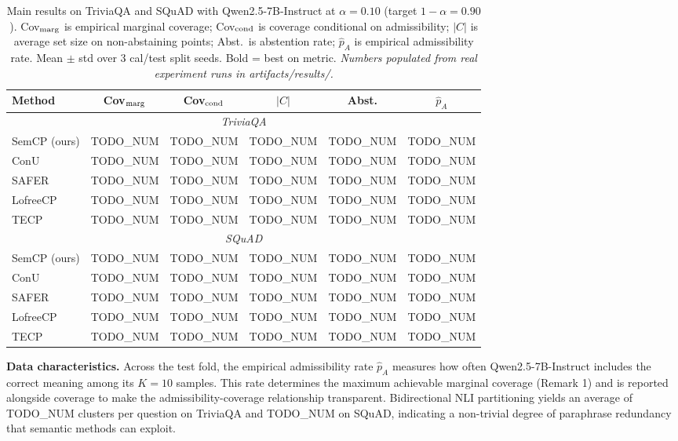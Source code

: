 \documentclass{article}
\begin{document}
\begin{table}[ht]
\centering
\caption{Main results on TriviaQA and SQuAD with Qwen2.5-7B-Instruct at $\alpha = 0.10$ (target $1-\alpha = 0.90$). Cov$_{\rm marg}$ is empirical marginal coverage; Cov$_{\rm cond}$ is coverage conditional on admissibility; $|C|$ is average set size on non-abstaining points; Abst.\ is abstention rate; $\hat{p}_A$ is empirical admissibility rate. Mean $\pm$ std over 3 cal/test split seeds. Bold = best on metric. \textit{Numbers populated from real experiment runs in artifacts/results/.}}
\label{tab:main_results}
\small
\begin{tabular}{lccccc}
\toprule
\textbf{Method} & \textbf{Cov$_{\rm marg}$} & \textbf{Cov$_{\rm cond}$} & \textbf{$|C|$} & \textbf{Abst.} & \textbf{$\hat{p}_A$} \\
\midrule
\multicolumn{6}{c}{\textit{TriviaQA}} \\
\midrule
SemCP (ours)  & TODO\_NUM & TODO\_NUM & TODO\_NUM & TODO\_NUM & TODO\_NUM \\
ConU          & TODO\_NUM & TODO\_NUM & TODO\_NUM & TODO\_NUM & TODO\_NUM \\
SAFER         & TODO\_NUM & TODO\_NUM & TODO\_NUM & TODO\_NUM & TODO\_NUM \\
LofreeCP      & TODO\_NUM & TODO\_NUM & TODO\_NUM & TODO\_NUM & TODO\_NUM \\
TECP          & TODO\_NUM & TODO\_NUM & TODO\_NUM & TODO\_NUM & TODO\_NUM \\
\midrule
\multicolumn{6}{c}{\textit{SQuAD}} \\
\midrule
SemCP (ours)  & TODO\_NUM & TODO\_NUM & TODO\_NUM & TODO\_NUM & TODO\_NUM \\
ConU          & TODO\_NUM & TODO\_NUM & TODO\_NUM & TODO\_NUM & TODO\_NUM \\
SAFER         & TODO\_NUM & TODO\_NUM & TODO\_NUM & TODO\_NUM & TODO\_NUM \\
LofreeCP      & TODO\_NUM & TODO\_NUM & TODO\_NUM & TODO\_NUM & TODO\_NUM \\
TECP          & TODO\_NUM & TODO\_NUM & TODO\_NUM & TODO\_NUM & TODO\_NUM \\
\bottomrule
\end{tabular}
\end{table}

\textbf{Data characteristics.} Across the test fold, the empirical admissibility rate $\hat{p}_A$ measures how often Qwen2.5-7B-Instruct includes the correct meaning among its $K = 10$ samples. This rate determines the maximum achievable marginal coverage (Remark 1) and is reported alongside coverage to make the admissibility-coverage relationship transparent. Bidirectional NLI partitioning yields an average of TODO\_NUM clusters per question on TriviaQA and TODO\_NUM on SQuAD, indicating a non-trivial degree of paraphrase redundancy that semantic methods can exploit.
\end{document}
